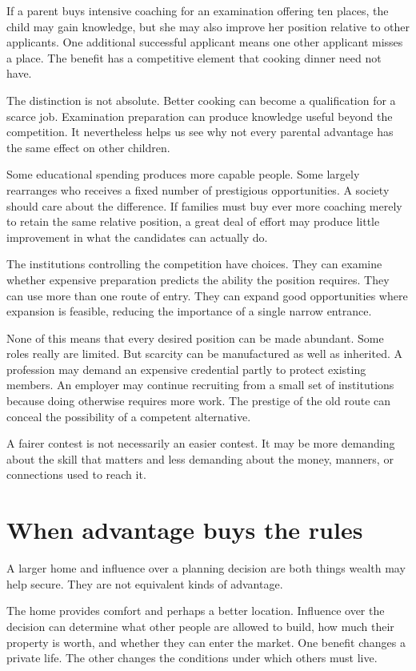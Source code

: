 \documentclass[12pt,a4paper]{book}
\begin{document}
If a parent buys intensive coaching for an examination offering ten places, the child may gain knowledge, but she may also improve her position relative to other applicants. One additional successful applicant means one other applicant misses a place. The benefit has a competitive element that cooking dinner need not have.

The distinction is not absolute. Better cooking can become a qualification for a scarce job. Examination preparation can produce knowledge useful beyond the competition. It nevertheless helps us see why not every parental advantage has the same effect on other children.

Some educational spending produces more capable people. Some largely rearranges who receives a fixed number of prestigious opportunities. A society should care about the difference. If families must buy ever more coaching merely to retain the same relative position, a great deal of effort may produce little improvement in what the candidates can actually do.

The institutions controlling the competition have choices. They can examine whether expensive preparation predicts the ability the position requires. They can use more than one route of entry. They can expand good opportunities where expansion is feasible, reducing the importance of a single narrow entrance.

None of this means that every desired position can be made abundant. Some roles really are limited. But scarcity can be manufactured as well as inherited. A profession may demand an expensive credential partly to protect existing members. An employer may continue recruiting from a small set of institutions because doing otherwise requires more work. The prestige of the old route can conceal the possibility of a competent alternative.

A fairer contest is not necessarily an easier contest. It may be more demanding about the skill that matters and less demanding about the money, manners, or connections used to reach it.

\section*{When advantage buys the rules}

A larger home and influence over a planning decision are both things wealth may help secure. They are not equivalent kinds of advantage.

The home provides comfort and perhaps a better location. Influence over the decision can determine what other people are allowed to build, how much their property is worth, and whether they can enter the market. One benefit changes a private life. The other changes the conditions under which others must live.
\end{document}
